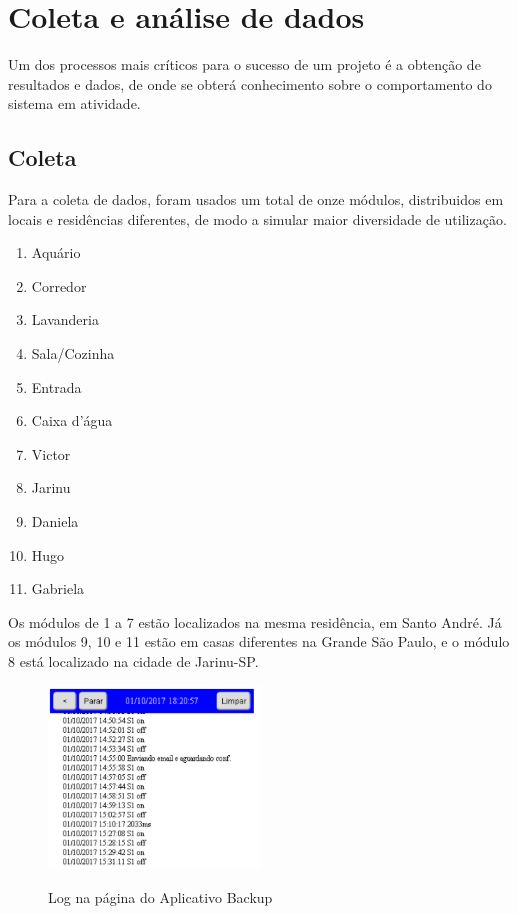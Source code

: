 \chapter{Coleta e análise de dados}

Um dos processos mais críticos para o sucesso de um projeto é a obtenção de resultados e dados, de onde se obterá conhecimento sobre o comportamento do sistema em atividade.

\section{Coleta}

Para a coleta de dados, foram usados um total de onze módulos, distribuidos em locais e residências diferentes, de modo a simular maior diversidade de utilização.

\begin{enumerate}
	\item Aquário
	\item Corredor
	\item Lavanderia
	\item Sala/Cozinha
	\item Entrada
	\item Caixa d’água
	\item Victor
	\item Jarinu
	\item Daniela
	\item Hugo
	\item Gabriela
\end{enumerate}

Os módulos de 1 a 7 estão localizados na mesma residência, em Santo André. Já os módulos 9, 10 e 11 estão em casas diferentes na Grande São Paulo, e o módulo 8 está localizado na cidade de Jarinu-SP.

\begin{figure}[H]
	\centering
	\caption{Log na página do Aplicativo Backup}
	\includegraphics[width=0.5\textwidth]{logAppBackup}
	\label{fig:logAppBackup}
\end{figure}

